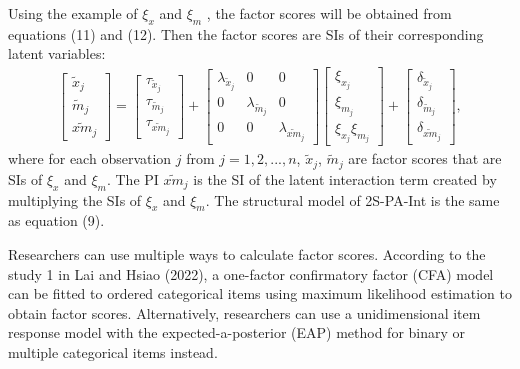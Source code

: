 \documentclass[
  11pt,
  man]{apa6}
\begin{document}
Using the example of \(\xi_{x}\) and \(\xi_{m}\) , the factor scores will be obtained from equations (11) and (12). Then the factor scores are SIs of their corresponding latent variables:
\begin{align}
    \begin{bmatrix}
        \tilde{x}_{j} \\ 
        \tilde{m}_{j} \\
        \widetilde{xm}_{j} 
    \end{bmatrix} = 
    \begin{bmatrix}
        \tau_{\tilde{x}_{j}} \\
        \tau_{\tilde{m}_{j}} \\ 
        \tau_{\widetilde{xm}_{j}}
    \end{bmatrix} + 
    \begin{bmatrix}
        \lambda_{\tilde{x}_{j}} & 0 & 0 \\
        0 & \lambda_{\tilde{m}_{j}} & 0 \\ 
        0 & 0 & \lambda_{\widetilde{xm}_{j}} 
    \end{bmatrix} 
    \begin{bmatrix}
        \xi_{x_{j}} \\  
        \xi_{m_{j}} \\
        \xi_{x_{j}}\xi_{m_{j}}
    \end{bmatrix} +
    \begin{bmatrix}
        \delta_{\tilde{x}_{j}} \\
        \delta_{\tilde{m}_{j}} \\ 
        \delta_{\widetilde{xm}_{j}}
    \end{bmatrix},
\end{align}
where for each observation \(j\) from \(j = 1, 2, ..., n\), \(\tilde{x}_{j}\), \(\tilde{m}_{j}\) are factor scores that are SIs of \(\xi_{x}\) and \(\xi_{m}\). The PI \(\widetilde{xm}_{j}\) is the SI of the latent interaction term created by multiplying the SIs of \(\xi_{x}\) and \(\xi_{m}\). The structural model of 2S-PA-Int is the same as equation (9).

Researchers can use multiple ways to calculate factor scores. According to the study 1 in Lai and Hsiao (2022), a one-factor confirmatory factor (CFA) model can be fitted to ordered categorical items using maximum likelihood estimation to obtain factor scores. Alternatively, researchers can use a unidimensional item response model with the expected-a-posterior (EAP) method for binary or multiple categorical items instead.
\end{document}
